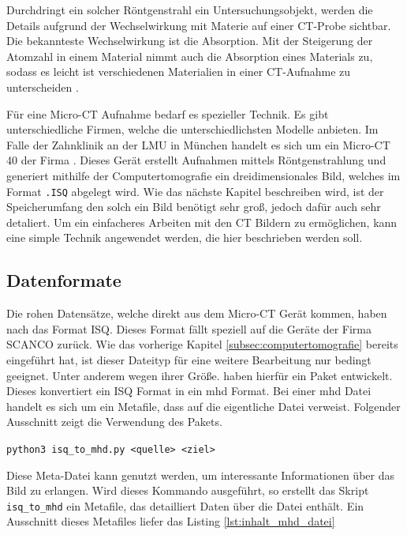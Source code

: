 Durchdringt ein solcher Röntgenstrahl ein Untersuchungsobjekt, werden die
Details aufgrund der Wechselwirkung mit Materie auf einer CT-Probe sichtbar. Die
bekannteste Wechselwirkung ist die Absorption. Mit der Steigerung der Atomzahl
in einem Material nimmt auch die Absorption eines Materials zu, sodass es leicht
ist verschiedenen Materialien in einer CT-Aufnahme zu unterscheiden \citep[vgl.][]{nib2024}.

Für eine Micro-CT Aufnahme bedarf es spezieller Technik. Es gibt unterschiedliche
Firmen, welche die unterschiedlichsten Modelle anbieten. Im Falle der Zahnklinik
an der LMU in München handelt es sich um ein Micro-CT 40 der Firma \citet{scanco2024}.
Dieses Gerät erstellt Aufnahmen mittels Röntgenstrahlung und generiert mithilfe der
Computertomografie ein dreidimensionales Bild, welches im Format \texttt{.ISQ} abgelegt
wird. Wie das nächste Kapitel beschreiben wird, ist der Speicherumfang den solch
ein Bild benötigt sehr groß, jedoch dafür auch sehr detaliert. Um ein einfacheres
Arbeiten mit den CT Bildern zu ermöglichen, kann eine simple Technik angewendet
werden, die hier beschrieben werden soll.

\subsection{Datenformate}
\label{subsec:datensätze} Die rohen Datensätze, welche direkt aus dem Micro-CT
Gerät kommen, haben nach \citet{scanco2024} das Format \ac{ISQ}. Dieses Format
fällt speziell auf die Geräte der Firma SCANCO zurück. Wie das vorherige Kapitel
\ref{subsec:computertomografie} bereits eingeführt hat, ist dieser Dateityp für
eine weitere Bearbeitung nur bedingt geeignet. Unter anderem wegen ihrer Größe.
\citet{RoeschKunzelmann2018} haben hierfür ein Paket entwickelt. Dieses
konvertiert ein \ac{ISQ} Format in ein \ac{mhd} Format. Bei einer \ac{mhd} Datei
handelt es sich um ein Metafile, dass auf die eigentliche Datei verweist.
Folgender Ausschnitt zeigt die Verwendung des Pakets.
\begin{center}
	\texttt{python3 isq\_to\_mhd.py <quelle> <ziel>}
\end{center}
Diese Meta-Datei kann genutzt werden, um interessante Informationen über das
Bild zu erlangen. Wird dieses Kommando ausgeführt, so erstellt das Skript
\texttt{isq\_to\_mhd} ein Metafile, das detailliert Daten über die Datei enthält.
Ein Ausschnitt dieses Metafiles liefer das Listing \ref{lst:inhalt_mhd_datei}

